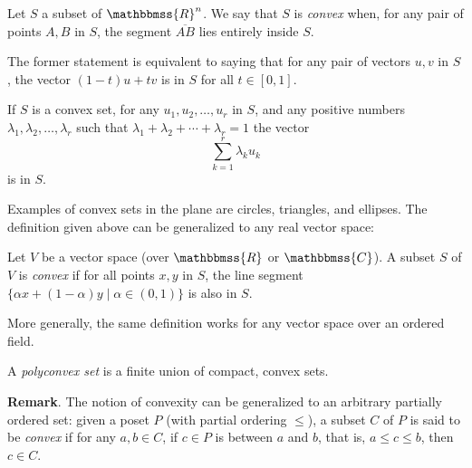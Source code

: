 \documentclass[12pt]{article}
\newcommand{\C}{\mathbbmss{C}}
\newcommand{\R}{\mathbbmss{R}}
\newcommand{\mathbb}[1]{\mathbbmss{#1}}
\begin{document}
Let $S$ a subset of $\mathbb{R}^n$. We say that $S$ is \emph{convex} when, for any pair of points $A,B$ in $S$, the segment $\overline{AB}$ lies entirely inside $S$.\smallskip

The former statement is equivalent to saying that for any pair of vectors $u,v$ in $S$, the vector $(1-t)u+tv$ is in $S$ for all $t\in[0,1]$.\smallskip

If $S$ is a convex set, for any $u_1,u_2,\ldots,u_r$ in $S$, and any positive numbers $\lambda_1,\lambda_2,\ldots,\lambda_r$ such that $\lambda_1+\lambda_2+\cdots+\lambda_r=1$ the vector
$$\sum_{k=1}^r\lambda_k u_k$$
is in $S$.\medskip

Examples of convex sets in the plane are circles, triangles, and ellipses.
The definition given above can be generalized to any real vector space:

Let $V$ be  a vector space (over $\R$ or $\C$). A subset $S$ of $V$ 
is \emph{convex} if for all points $x,y$ in $S$, the line segment
$\{\alpha x + (1-\alpha) y \mid  \alpha\in(0,1)\} $ is also in $S$.

More generally, the same definition works for any vector space over an
ordered field.

A \emph{polyconvex set} is a finite union of compact, convex sets.

\textbf{Remark}.  The notion of convexity can be generalized to an arbitrary partially ordered set: given a poset $P$ (with partial ordering $\le$), a subset $C$ of $P$ is said to be \emph{convex} if for any $a,b\in C$, if $c\in P$ is between $a$ and $b$, that is, $a\le c \le b$, then $c\in C$.
\end{document}
